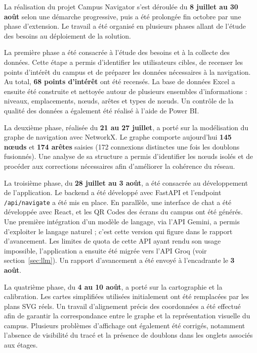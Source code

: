 \documentclass[12pt,a4paper]{report}
\begin{document}
La réalisation du projet Campus Navigator s'est déroulée du \textbf{8 juillet au 30 août} selon
une démarche progressive, puis a été prolongée fin octobre par une phase d'extension. Le travail
a été organisé en plusieurs phases allant de l'étude des besoins au déploiement de la solution.

La première phase a été consacrée à l'étude des besoins et à la collecte des données. Cette étape
a permis d'identifier les utilisateurs cibles, de recenser les points d'intérêt du campus et de
préparer les données nécessaires à la navigation. Au total, \textbf{68 points d'intérêt} ont été
recensés. La base de données Excel a ensuite été construite et nettoyée autour de plusieurs
ensembles d'informations : niveaux, emplacements, nœuds, arêtes et types de nœuds. Un contrôle de
la qualité des données a également été réalisé à l'aide de Power BI.

La deuxième phase, réalisée du \textbf{21 au 27 juillet}, a porté sur la modélisation du graphe de
navigation avec NetworkX. Le graphe comporte aujourd'hui \textbf{145 nœuds} et \textbf{174
arêtes} saisies (172 connexions distinctes une fois les doublons fusionnés). Une analyse de sa
structure a permis d'identifier les nœuds isolés et de procéder aux corrections nécessaires afin
d'améliorer la cohérence du réseau.

La troisième phase, du \textbf{28 juillet au 3 août}, a été consacrée au développement de
l'application. Le backend a été développé avec FastAPI et l'endpoint \texttt{/api/navigate} a
été mis en place. En parallèle, une interface de chat a été développée avec React, et les QR Codes
des écrans du campus ont été générés. Une première intégration d'un modèle de langage, via l'API
Gemini, a permis d'exploiter le langage naturel ; c'est cette version qui figure dans le rapport
d'avancement. Les limites de quota de cette API ayant rendu son usage impossible, l'application a
ensuite été migrée vers l'API Groq (voir section~\ref{sec:llm}). Un rapport d'avancement a été
envoyé à l'encadrante le \textbf{3 août}.

La quatrième phase, du \textbf{4 au 10 août}, a porté sur la cartographie et la calibration. Les
cartes simplifiées utilisées initialement ont été remplacées par les plans SVG réels. Un travail
d'alignement précis des coordonnées a été effectué afin de garantir la correspondance entre le
graphe et la représentation visuelle du campus. Plusieurs problèmes d'affichage ont également été
corrigés, notamment l'absence de visibilité du tracé et la présence de doublons dans les onglets
associés aux étages.
\end{document}
